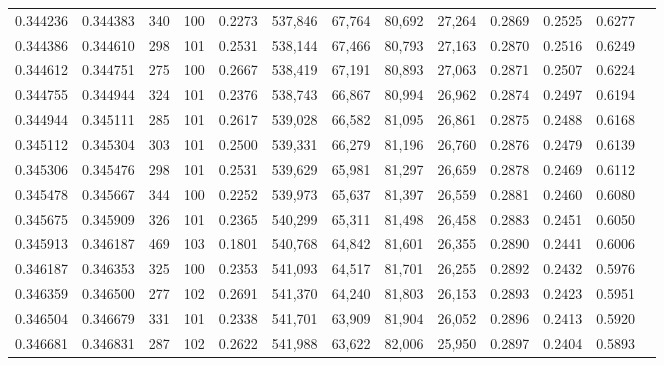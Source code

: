 \begin{tabular}{rrrrrrrrrrrrr}
0.344236 & 0.344383 &   340 & 100 &                                     0.2273 & 537,846 &  67,764 &  80,692 &  27,264 & 0.2869 & 0.2525 & 0.6277 \\
0.344386 & 0.344610 &   298 & 101 &                                     0.2531 & 538,144 &  67,466 &  80,793 &  27,163 & 0.2870 & 0.2516 & 0.6249 \\
0.344612 & 0.344751 &   275 & 100 &                                     0.2667 & 538,419 &  67,191 &  80,893 &  27,063 & 0.2871 & 0.2507 & 0.6224 \\
0.344755 & 0.344944 &   324 & 101 &                                     0.2376 & 538,743 &  66,867 &  80,994 &  26,962 & 0.2874 & 0.2497 & 0.6194 \\
0.344944 & 0.345111 &   285 & 101 &                                     0.2617 & 539,028 &  66,582 &  81,095 &  26,861 & 0.2875 & 0.2488 & 0.6168 \\
0.345112 & 0.345304 &   303 & 101 &                                     0.2500 & 539,331 &  66,279 &  81,196 &  26,760 & 0.2876 & 0.2479 & 0.6139 \\
0.345306 & 0.345476 &   298 & 101 &                                     0.2531 & 539,629 &  65,981 &  81,297 &  26,659 & 0.2878 & 0.2469 & 0.6112 \\
0.345478 & 0.345667 &   344 & 100 &                                     0.2252 & 539,973 &  65,637 &  81,397 &  26,559 & 0.2881 & 0.2460 & 0.6080 \\
0.345675 & 0.345909 &   326 & 101 &                                     0.2365 & 540,299 &  65,311 &  81,498 &  26,458 & 0.2883 & 0.2451 & 0.6050 \\
0.345913 & 0.346187 &   469 & 103 &                                     0.1801 & 540,768 &  64,842 &  81,601 &  26,355 & 0.2890 & 0.2441 & 0.6006 \\
0.346187 & 0.346353 &   325 & 100 &                                     0.2353 & 541,093 &  64,517 &  81,701 &  26,255 & 0.2892 & 0.2432 & 0.5976 \\
0.346359 & 0.346500 &   277 & 102 &                                     0.2691 & 541,370 &  64,240 &  81,803 &  26,153 & 0.2893 & 0.2423 & 0.5951 \\
0.346504 & 0.346679 &   331 & 101 &                                     0.2338 & 541,701 &  63,909 &  81,904 &  26,052 & 0.2896 & 0.2413 & 0.5920 \\
0.346681 & 0.346831 &   287 & 102 &                                     0.2622 & 541,988 &  63,622 &  82,006 &  25,950 & 0.2897 & 0.2404 & 0.5893 \\

\end{tabular}
